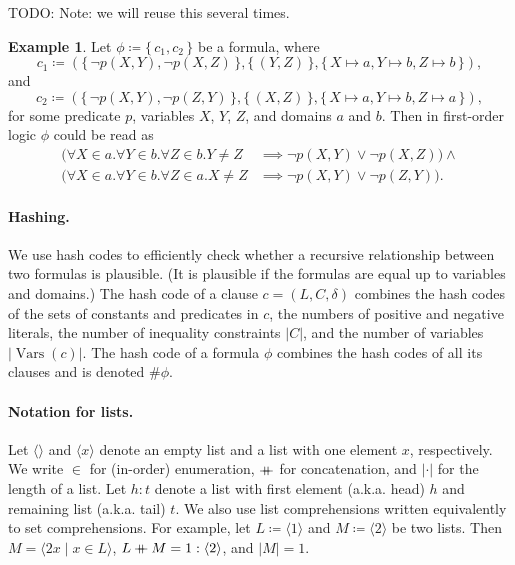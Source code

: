 \documentclass{article}
\theoremstyle{definition}
\newtheorem{example}{Example}
\theoremstyle{remark}
\newcommand\mdoubleplus{\mathbin{+\mkern-10mu+}}
\DeclareMathOperator{\Vars}{Vars}
\begin{document}
TODO: Note: we will reuse this several times.
\begin{example} \label{example:first}
  Let $\phi \coloneqq \{\, c_1, c_2 \,\}$ be a formula, where
  \begin{equation} \label{phi1}
    c_1 \coloneqq (\{\, \neg p(X, Y), \neg p(X, Z) \,\}, \{\, (Y, Z) \,\}, \{\, X \mapsto a, Y \mapsto b, Z \mapsto b \,\}),
  \end{equation}
  and
  \begin{equation} \label{phi2}
    c_2 \coloneqq (\{\, \neg p(X, Y), \neg p(Z, Y) \,\}, \{\, (X, Z) \,\}, \{\, X \mapsto a, Y \mapsto b, Z \mapsto a \,\}),
  \end{equation}
  for some predicate $p$, variables $X$, $Y$, $Z$, and domains $a$ and $b$. Then in first-order logic $\phi$ could be read as
  \begin{align*}
    (\forall X \in a. \forall Y \in b. \forall Z \in b. Y \ne Z &\implies \neg p(X, Y) \lor \neg p(X, Z)) \land \\
    (\forall X \in a. \forall Y \in b. \forall Z \in a. X \ne Z &\implies \neg p(X, Y) \lor \neg p(Z, Y)).
  \end{align*}
\end{example}

\paragraph{Hashing.}
We use hash codes to efficiently check whether a recursive relationship between two formulas is plausible. (It is plausible if the formulas are equal up to variables and domains.) The hash code of a clause $c = (L, C, \delta)$ combines the hash codes of the sets of constants and predicates in $c$, the numbers of positive and negative literals, the number of inequality constraints $|C|$, and the number of variables $|\Vars(c)|$. The hash code of a formula $\phi$ combines the hash codes of all its clauses and is denoted $\#\phi$.

\paragraph{Notation for lists.}
Let $\langle\rangle$ and $\langle x \rangle$ denote an empty list and a list with one element $x$, respectively. We write $\in$ for (in-order) enumeration, $\mdoubleplus$ for concatenation, and $|\cdot|$ for the length of a list. Let $h : t$ denote a list with first element (a.k.a. head) $h$ and remaining list (a.k.a. tail) $t$. We also use list comprehensions written equivalently to set comprehensions. For example, let $L \coloneqq \langle 1 \rangle$ and $M \coloneqq \langle 2 \rangle$ be two lists. Then $M = \langle 2x \mid x \in L \rangle$, $L \mdoubleplus M = 1 : \langle 2 \rangle$, and $|M| = 1$.
\end{document}
